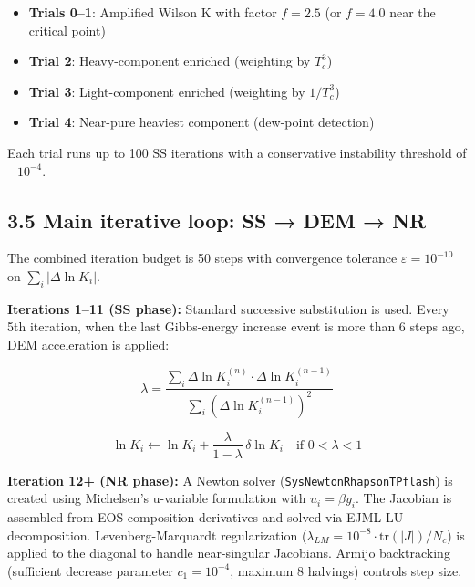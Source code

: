 \documentclass[review,3p]{custom}
\begin{document}
\begin{itemize}
  \item \textbf{Trials 0–1}: Amplified Wilson K with factor $f = 2.5$ (or $f = 4.0$ near the critical point)
  \item \textbf{Trial 2}: Heavy-component enriched (weighting by $T_c^3$)
  \item \textbf{Trial 3}: Light-component enriched (weighting by $1/T_c^3$)
  \item \textbf{Trial 4}: Near-pure heaviest component (dew-point detection)
\end{itemize}

Each trial runs up to 100 SS iterations with a conservative instability threshold of $-10^{-4}$.

\subsection{3.5 Main iterative loop: SS → DEM → NR}

The combined iteration budget is 50 steps with convergence tolerance $\varepsilon = 10^{-10}$
on $\sum_i |\Delta \ln K_i|$.

\textbf{Iterations 1–11 (SS phase):} Standard successive substitution is used. Every
5th iteration, when the last Gibbs-energy increase event is more than 6 steps ago,
DEM acceleration is applied:

\begin{equation}

\lambda = \frac{\sum_i \Delta\ln K_i^{(n)} \cdot \Delta\ln K_i^{(n-1)}}{\sum_i (\Delta\ln K_i^{(n-1)})^2}

\end{equation}

\begin{equation}

\ln K_i \leftarrow \ln K_i + \frac{\lambda}{1-\lambda}\,\delta\ln K_i \quad \text{if } 0 < \lambda < 1

\end{equation}

\textbf{Iteration 12+ (NR phase):} A Newton solver (\texttt{SysNewtonRhapsonTPflash}) is created
using Michelsen's u-variable formulation with $u_i = \beta y_i$. The Jacobian is
assembled from EOS composition derivatives and solved via EJML LU decomposition.
Levenberg-Marquardt regularization ($\lambda_{LM} = 10^{-8} \cdot \text{tr}(|J|)/N_c$)
is applied to the diagonal to handle near-singular Jacobians. Armijo backtracking
(sufficient decrease parameter $c_1 = 10^{-4}$, maximum 8 halvings) controls step size.
\end{document}

